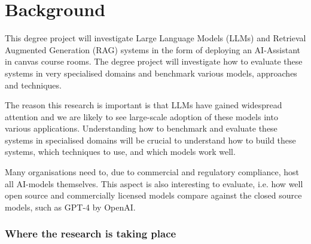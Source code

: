 



\section{Background}
\label{sec:background}


This degree project will investigate Large Language Models (\gls{LLMs}) and Retrieval Augmented Generation (\gls{RAG}) systems in the form of deploying an AI-Assistant in canvas course rooms. The degree project will investigate how to evaluate these systems in very specialised domains and benchmark various models, approaches and techniques.

The reason this research is important is that LLMs have gained widespread attention and we are likely to see large-scale adoption of these models into various applications. Understanding how to benchmark and evaluate these systems in specialised domains will be crucial to understand how to build these systems, which techniques to use, and which models work well.


Many organisations need to, due to commercial and regulatory compliance, host all AI-models themselves. This aspect is also interesting to evaluate, i.e. how well open source and commercially licensed models compare against the closed source models, such as GPT-4 by OpenAI.




\subsubsection{Where the research is taking place}


